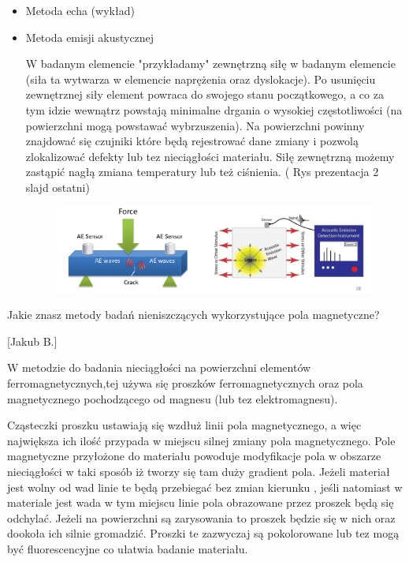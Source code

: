 \documentclass{article}
\begin{document}
\begin{enumerate}
\begin{itemize}
\item Metoda echa (wykład)


\item Metoda emisji akustycznej 

W badanym elemencie "przykładamy"  zewnętrzną siłę w badanym elemencie (siła ta wytwarza w elemencie naprężenia oraz dyslokacje). Po usunięciu zewnętrznej siły element powraca do swojego stanu początkowego, a co za tym idzie wewnątrz powstają minimalne drgania o wysokiej częstotliwości (na powierzchni mogą powstawać wybrzuszenia). Na powierzchni powinny znajdować się czujniki które będą rejestrować dane zmiany i pozwolą zlokalizować  defekty lub tez nieciągłości materiału. Siłę  zewnętrzną możemy zastąpić nagłą zmiana temperatury lub też ciśnienia. 
( Rys prezentacja 2 slajd ostatni)

\begin{figure}[h!]
\includegraphics[width=\textwidth]{include/faleakust}
\end{figure}

\end{itemize}




{\Large \bf  \item Jakie znasz metody badań nieniszczących wykorzystujące pola magnetyczne?}  [Jakub B.]
 

W metodzie do badania nieciągłości na powierzchni elementów ferromagnetycznych,tej używa się proszków ferromagnetycznych  oraz pola magnetycznego pochodzącego od magnesu (lub tez elektromagnesu). 

Cząsteczki proszku ustawiają się wzdłuż linii pola magnetycznego, a więc największa ich ilość przypada w miejscu silnej zmiany pola magnetycznego. Pole magnetyczne przyłożone do materiału powoduje modyfikacje pola w obszarze nieciągłości w taki sposób iż tworzy się tam duży gradient pola. Jeżeli materiał jest wolny od wad linie te będą przebiegać bez zmian kierunku , jeśli natomiast w materiale jest wada w tym miejscu linie pola obrazowane przez proszek będą się odchylać. 
Jeżeli na powierzchni są zarysowania to proszek będzie się w nich oraz dookoła ich  silnie gromadzić. Proszki te zazwyczaj są pokolorowane lub tez mogą być fluorescencyjne co ułatwia badanie materiału. 


\end{enumerate}
\end{document}
